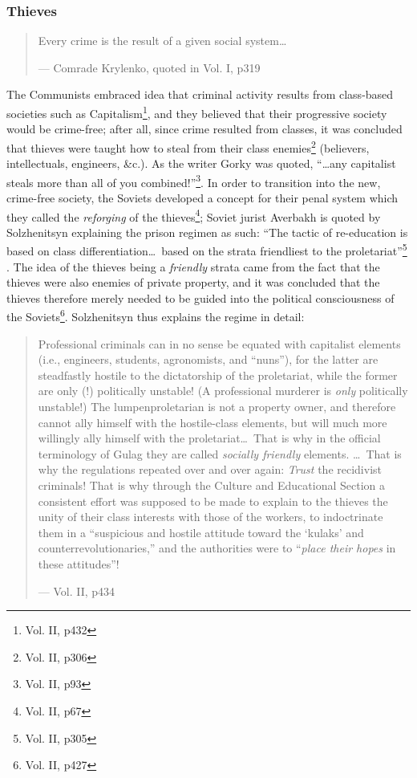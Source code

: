 \documentclass{article}
\begin{document}
\subsubsection{Thieves}
\begin{quote}
Every crime is the result of a given social system\ldots

--- Comrade Krylenko, quoted in Vol. I, p319
\end{quote}

The Communists embraced idea that criminal activity results from class-based societies such as Capitalism\footnote{Vol. II, p432}, and they believed that their progressive society would be crime-free; after all, since crime resulted from classes, it was concluded that thieves were taught how to steal from their class enemies\footnote{Vol. II, p306} (believers, intellectuals, engineers, \&c.).  As the writer Gorky was quoted, ``\ldots any capitalist steals more than all of you combined!''\footnote{Vol. II, p93}.  In order to transition into the new, crime-free society, the Soviets developed a concept for their penal system which they called the \emph{reforging} of the thieves\footnote{Vol. II, p67}; Soviet jurist Averbakh is quoted by Solzhenitsyn explaining the prison regimen as such: ``The tactic of re-education is based on class differentiation\ldots~based on the strata friendliest to the proletariat''\footnote{Vol. II, p305} .  The idea of the thieves being a \emph{friendly} strata came from the fact that the thieves were also enemies of private property, and it was concluded that the thieves therefore merely needed to be guided into the political consciousness of the Soviets\footnote{Vol. II, p427}.  Solzhenitsyn thus explains the regime in detail:

\begin{quote}
Professional criminals can in no sense be equated with capitalist elements (i.e., engineers, students, agronomists, and ``nuns''), for the latter are steadfastly hostile to the dictatorship of the proletariat, while the former are only (!) politically unstable!  (A professional murderer is \emph{only} politically unstable!)  The lumpenproletarian is not a property owner, and therefore cannot ally himself with the hostile-class elements, but will much more willingly ally himself with the proletariat\ldots~That is why in the official terminology of Gulag they are called \emph{socially friendly} elements.  \ldots~That is why the regulations repeated over and over again: \emph{Trust} the recidivist criminals!  That is why through the Culture and Educational Section a consistent effort was supposed to be made to explain to the thieves the unity of their class interests with those of the workers, to indoctrinate them in a ``suspicious and hostile attitude toward the `kulaks' and counterrevolutionaries,'' and the authorities were to ``\emph{place their hopes} in these attitudes''!

--- Vol. II, p434
\end{quote}
\end{document}
